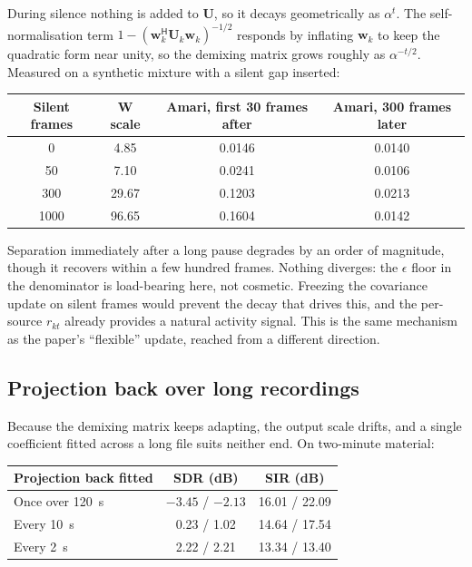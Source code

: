 \documentclass[11pt,a4paper]{article}
\newcommand{\W}{\boldsymbol{W}}
\newcommand{\U}{\boldsymbol{U}}
\newcommand{\w}{\boldsymbol{w}}
\newcommand{\herm}{^{\mathsf{H}}}
\begin{document}
During silence nothing is added to $\U$, so it decays geometrically as
$\alpha^{t}$. The self-normalisation term $1 - (\w_k\herm\U_k\w_k)^{-1/2}$
responds by inflating $\w_k$ to keep the quadratic form near unity, so the
demixing matrix grows roughly as $\alpha^{-t/2}$. Measured on a synthetic
mixture with a silent gap inserted:

\begin{table}[h]
\centering
\begin{tabular}{cccc}
\toprule
Silent frames & $\W$ scale & Amari, first 30 frames after & Amari, 300 frames later \\
\midrule
0 & 4.85 & 0.0146 & 0.0140 \\
50 & 7.10 & 0.0241 & 0.0106 \\
300 & 29.67 & 0.1203 & 0.0213 \\
1000 & 96.65 & 0.1604 & 0.0142 \\
\bottomrule
\end{tabular}
\end{table}

Separation immediately after a long pause degrades by an order of magnitude,
though it recovers within a few hundred frames. Nothing diverges: the $\epsilon$
floor in the denominator is load-bearing here, not cosmetic. Freezing the
covariance update on silent frames would prevent the decay that drives this, and
the per-source $r_{kt}$ already provides a natural activity signal. This is the
same mechanism as the paper's ``flexible'' update, reached from a different
direction.

\subsection{Projection back over long recordings}

Because the demixing matrix keeps adapting, the output scale drifts, and a
single coefficient fitted across a long file suits neither end. On two-minute
material:

\begin{table}[h]
\centering
\begin{tabular}{lcc}
\toprule
Projection back fitted & SDR (dB) & SIR (dB) \\
\midrule
Once over 120~s & $-3.45$ / $-2.13$ & 16.01 / 22.09 \\
Every 10~s & 0.23 / 1.02 & 14.64 / 17.54 \\
Every 2~s & 2.22 / 2.21 & 13.34 / 13.40 \\
\bottomrule
\end{tabular}
\end{table}
\end{document}
